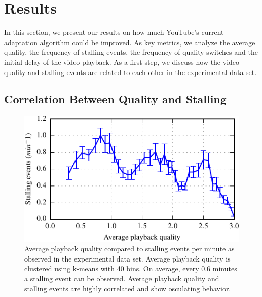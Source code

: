 
\section{Results}
\label{sec:results}

In this section, we present our results on how much YouTube's current adaptation algorithm could be improved. As key metrics, we analyze the average quality, the frequency of stalling events, the frequency of quality switches and the initial delay of the video playback. As a first step, we discuss how the video quality and stalling events are related to each other in the experimental data set.

\subsection{Correlation Between Quality and Stalling}

\begin{figure}[t]
\centering
\includegraphics[width=\columnwidth]{figs/33qualityvstalling}%
\caption{Average playback quality compared to stalling events per minute as observed in the experimental data set. Average playback quality is clustered using k-means with 40 bins. On average, every 0.6 minutes a stalling event can be observed. Average playback quality and stalling events are highly correlated and show osculating behavior.}
\label{fig:qualityvsstalling}%
\end{figure}

